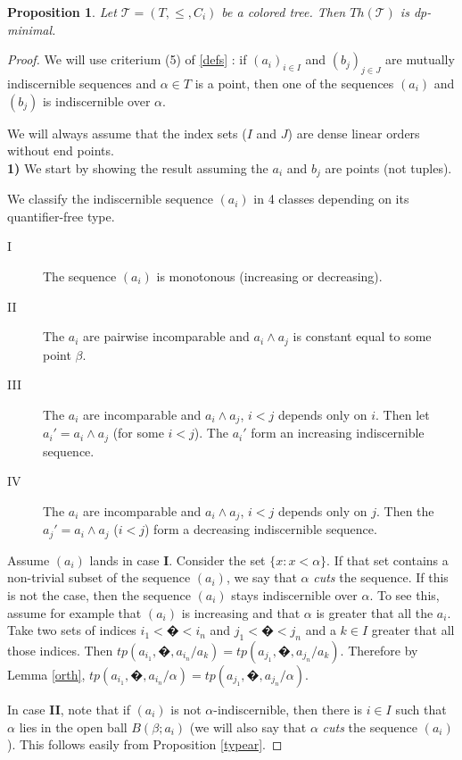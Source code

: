 \documentclass[english]{article}
\newtheorem{prop}[thm]{Proposition}
\theoremstyle{definition}
\theoremstyle{mystyle}
\theoremstyle{remark}
\begin{document}
\begin{prop}
Let $\mathcal T=(T,\leq,C_i)$ be a colored tree. Then $Th(\mathcal T)$ is dp-minimal.
\end{prop}
\begin{proof}

We will use criterium (5) of \ref{defs} : if $(a_i)_{i \in I}$ and $(b_j)_{j \in J}$ are mutually indiscernible sequences and $\alpha \in T$ is a point, then one of the sequences $(a_i)$ and $(b_j)$ is indiscernible over $\alpha$.

We will always assume that the index sets ($I$ and $J$) are dense linear orders without end points.
\\

\textbf{1)} We start by showing the result assuming the $a_i$ and $b_j$ are points (not tuples).

We classify the indiscernible sequence $(a_i)$ in 4 classes depending on its quantifier-free type.

\begin{description}
\item[ I] The sequence $(a_i)$ is monotonous (increasing or decreasing).
\item[II] The $a_i$ are pairwise incomparable and $a_i \wedge a_j$ is constant equal to some point $\beta$.
\item[III] The $a_i$ are incomparable and $a_i \wedge a_j$, $i < j$ depends only on $i$. Then let $a_i' = a_i \wedge a_j$ (for some $i < j$). The $a_i'$ form an increasing indiscernible sequence.
\item[IV] The $a_i$ are incomparable and $a_i \wedge a_j$, $i < j$ depends only on $j$. Then the $a_j' = a_i \wedge a_j$ ($i<j$) form a decreasing indiscernible sequence.
\end{description}

Assume $(a_i)$ lands in case \textbf{I}. Consider the set $\{x : x< \alpha\}$. If that set contains a non-trivial subset of the sequence $(a_i)$, we say that $\alpha$ \emph{cuts} the sequence. If this is not the case, then the sequence $(a_i)$ stays indiscernible over $\alpha$. To see this, assume for example that $(a_i)$ is increasing and that $\alpha$ is greater that all the $a_i$. Take two sets of indices $i_1 < � < i_n$ and $j_1 < � < j_n$ and a $k \in I$ greater that all those indices. Then $tp(a_{i_1},�,a_{i_n}/a_k) = tp(a_{j_1},�,a_{j_n}/a_k)$. Therefore by Lemma \ref{orth}, $tp(a_{i_1},�,a_{i_n}/\alpha) = tp(a_{j_1},�,a_{j_n}/\alpha)$.

In case \textbf{II}, note that if $(a_i)$ is not $\alpha$-indiscernible, then there is $i \in I$ such that $\alpha$ lies in the open ball $B(\beta;a_i)$ (we will also say that $\alpha$ \emph{cuts} the sequence $(a_i)$). This follows easily from Proposition \ref{typear}.


\end{proof}
\end{document}
